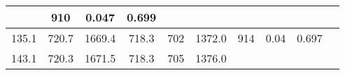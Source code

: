 \documentclass[a4paper,10pt]{article}
\begin{document}
\begin{longtable}{
     |
%    
    c|
%    
    c|
%    
    c|
%    
    c|
%    
    c|
%    
    c|
%    
    c|
%    
    c|
%    
    c|
%    
    c|
%    
    }
%        
        & 910
%        

%        

%        
        & 0.047
%        

%        

%        
        & 0.699
%        

%        
        \\
        \hline

        

%        

%        
        135.1
%        

%        

%        
        & 720.7
%        

%        

%        
        & 1669.4
%        

%        

%        
        & 718.3
%        

%        

%        
        & 702
%        

%        

%        
        & 1372.0
%        

%        

%        
        & 914
%        

%        

%        
        & 0.04
%        

%        

%        
        & 0.697
%        

%        
        \\
        \hline

        

%        

%        
        143.1
%        

%        

%        
        & 720.3
%        

%        

%        
        & 1671.5
%        

%        

%        
        & 718.3
%        

%        

%        
        & 705
%        

%        

%        
        & 1376.0
%        

%        


\end{longtable}
\end{document}
